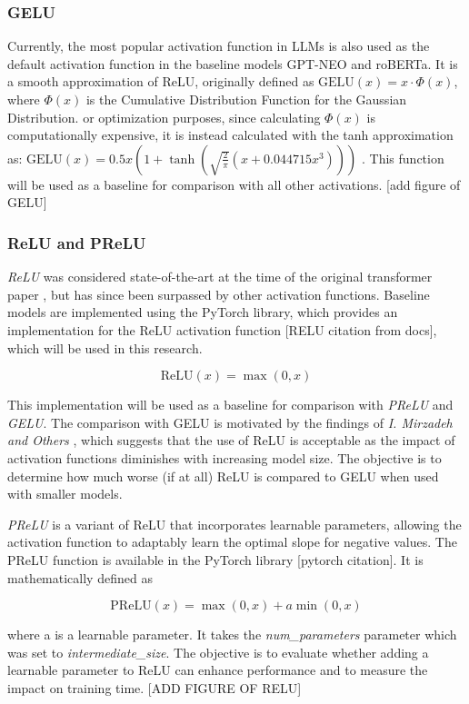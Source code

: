 \subsubsection{GELU}
Currently, the most popular activation function in LLMs is also used as the default activation function in the baseline models GPT-NEO and roBERTa. It is a smooth approximation of ReLU, originally defined as \(\text{GELU}(x) = x \cdot \Phi(x)\), where \(\Phi(x)\) is the Cumulative Distribution Function for the Gaussian Distribution. or optimization purposes, since calculating \(\Phi(x)\) is computationally expensive, it is instead calculated with the tanh approximation as:
\(\text{GELU}(x) = 0.5x \left(1 + \tanh\left(\sqrt{\frac{2}{\pi}} \left(x + 0.044715x^3\right)\right)\right)\) \cite{Hendrycks2023}. This function will be used as a baseline for comparison with all other activations.
[add figure of GELU]

\subsubsection{ReLU and PReLU}
\textit{ReLU} was considered state-of-the-art at the time of the original transformer paper \cite{Vaswani2017}, but has since been surpassed by other activation functions. Baseline models are implemented using the PyTorch library, which provides an implementation for the ReLU activation function [RELU citation from docs], which will be used in this research. 

\[
\text{ReLU}(x) = \max(0, x)
\]

This implementation will be used as a baseline for comparison with \textit{PReLU} and \textit{GELU}. The comparison with GELU is motivated by the findings of \textit{I. Mirzadeh and Others} \cite{Mirzadeh2023}, which suggests that the use of ReLU is acceptable as the impact of activation functions diminishes with increasing model size. The objective is to determine how much worse (if at all) ReLU is compared to GELU when used with smaller models.

\textit{PReLU} is a variant of ReLU that incorporates learnable parameters, allowing the activation function to adaptably learn the optimal slope for negative values. The PReLU function is available in the PyTorch library [pytorch citation]. It is mathematically defined as

\[
\text{PReLU}(x) = \max(0, x) + a \min(0, x)
\]

where a is a learnable parameter. It takes the \textit{num\_parameters} parameter which was set to \textit{intermediate\_size}. The objective is to evaluate whether adding a learnable parameter to ReLU can enhance performance and to measure the impact on training time.
[ADD FIGURE OF RELU]

